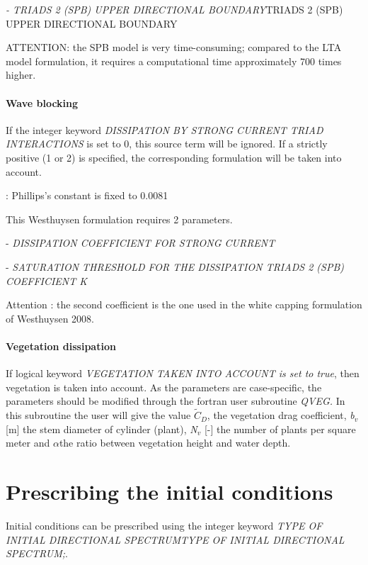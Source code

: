  \textit{- TRIADS 2 (SPB) UPPER DIRECTIONAL BOUNDARY}TRIADS 2 (SPB) UPPER DIRECTIONAL BOUNDARY

 ATTENTION: the SPB model is very time-consuming; compared to the LTA model formulation, it requires a computational time approximately 700 times higher.


\paragraph{ Wave blocking }

 If the integer keyword \textit{DISSIPATION BY STRONG CURRENT TRIAD INTERACTIONS} is set to 0, this source term will be ignored. If a strictly positive (1 or 2) is specified, the corresponding formulation will be taken into account.

 \textbf{} : Phillips's constant is fixed to 0.0081\textbf{\underbar{}}

 \textbf{}

 This Westhuysen formulation requires 2 parameters.

 - \textit{DISSIPATION COEFFICIENT FOR STRONG CURRENT}

 - \textit{SATURATION THRESHOLD FOR THE DISSIPATION TRIADS 2 (SPB) COEFFICIENT K}

 Attention : the second coefficient is the one used in the white capping formulation of Westhuysen 2008.


\paragraph{ Vegetation dissipation}

 If logical keyword \textit{VEGETATION TAKEN INTO ACCOUNT is set to true}, then vegetation is taken into account. As the parameters are case-specific, the parameters should be modified through the fortran user subroutine \textit{QVEG. }In this subroutine the user will give the value $\tilde{C}_{D} $, the vegetation drag coefficient, \textit{b${}_{v}$} [m] the stem diameter of cylinder (plant), \textit{N${}_{v}$} [-] the number of plants per square meter and $\alpha $the ratio between vegetation height and water depth.


\section{ Prescribing the initial conditions}

 Initial conditions can be prescribed using the integer keyword \textit{TYPE OF INITIAL DIRECTIONAL SPECTRUMTYPE OF INITIAL DIRECTIONAL SPECTRUM;}.

